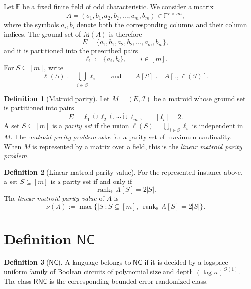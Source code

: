 \documentclass[10pt,a4paper]{article}
\theoremstyle{definition}
\newtheorem{definition}{Definition}
\begin{document}
Let $\mathbb F$ be a fixed finite field of odd characteristic. We consider a
matrix
\begin{equation}
  A=(a_1,b_1,a_2,b_2,\ldots,a_m,b_m)\in \mathbb F^{r\times 2m},
\end{equation}
where the symbols $a_i,b_i$ denote both the corresponding columns and their
column indices. The ground set of $M(A)$ is therefore
\begin{equation}
  E=\{a_1,b_1,a_2,b_2,\ldots,a_m,b_m\},
\end{equation}
and it is partitioned into the prescribed pairs
\begin{equation}
  \ell_i:=\{a_i,b_i\},\qquad i\in[m].
\end{equation}
For $S\subseteq[m]$, write
\begin{equation}
  \ell(S):=\bigcup_{i\in S}\ell_i
  \qquad\text{and}\qquad
  A[S]:=A[:,\ell(S)].
\end{equation}

\begin{definition}[Matroid parity]
Let $M=(E,\mathcal I)$ be a matroid whose ground set is partitioned into
pairs
\begin{equation}
  E=\ell_1\mathbin{\dot\cup}\ell_2\mathbin{\dot\cup}\cdots
  \mathbin{\dot\cup}\ell_m,
  \qquad |\ell_i|=2.
\end{equation}
A set $S\subseteq[m]$ is a \emph{parity set} if the union
$\ell(S)=\bigcup_{i\in S}\ell_i$ is independent in $M$. The
\emph{matroid parity problem} asks for a parity set of maximum cardinality.
When $M$ is represented by a matrix over a field, this is the
\emph{linear matroid parity problem}.
\end{definition}

\begin{definition}[Linear matroid parity value]
For the represented instance above, a set $S\subseteq[m]$ is a parity set
if and only if
\begin{equation}
  \operatorname{rank}_{\mathbb F} A[S]=2|S|.
\end{equation}
The \emph{linear matroid parity value} of $A$ is
\begin{equation}
  \nu(A):=\max\bigl\{|S|:S\subseteq[m],\
  \operatorname{rank}_{\mathbb F}A[S]=2|S|\bigr\}.
\end{equation}
\end{definition}

\section{Definition $\mathsf{NC}$}
\begin{definition}[$\mathsf{NC}$]
A language belongs to $\mathsf{NC}$ if it is decided by a logspace-uniform
family of Boolean circuits of polynomial size and depth $(\log n)^{O(1)}$.
The class $\mathsf{RNC}$ is the corresponding bounded-error randomized class.
\end{definition}
\end{document}
